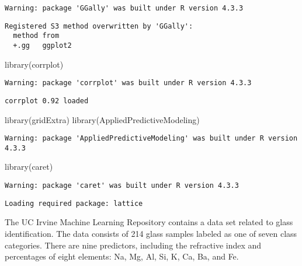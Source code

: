 \documentclass[
  letterpaper,
  DIV=11,
  numbers=noendperiod]{scrartcl}
\newenvironment{Shaded}{\begin{snugshade}}{\end{snugshade}}
\newcommand{\FunctionTok}[1]{\textcolor[rgb]{0.28,0.35,0.67}{#1}}
\newcommand{\NormalTok}[1]{\textcolor[rgb]{0.00,0.23,0.31}{#1}}
\begin{document}
\begin{verbatim}
Warning: package 'GGally' was built under R version 4.3.3
\end{verbatim}

\begin{verbatim}
Registered S3 method overwritten by 'GGally':
  method from   
  +.gg   ggplot2
\end{verbatim}

\begin{Shaded}
\begin{Highlighting}[]
\FunctionTok{library}\NormalTok{(corrplot)}
\end{Highlighting}
\end{Shaded}

\begin{verbatim}
Warning: package 'corrplot' was built under R version 4.3.3
\end{verbatim}

\begin{verbatim}
corrplot 0.92 loaded
\end{verbatim}

\begin{Shaded}
\begin{Highlighting}[]
\FunctionTok{library}\NormalTok{(gridExtra)}
\FunctionTok{library}\NormalTok{(AppliedPredictiveModeling)}
\end{Highlighting}
\end{Shaded}

\begin{verbatim}
Warning: package 'AppliedPredictiveModeling' was built under R version 4.3.3
\end{verbatim}

\begin{Shaded}
\begin{Highlighting}[]
\FunctionTok{library}\NormalTok{(caret)}
\end{Highlighting}
\end{Shaded}

\begin{verbatim}
Warning: package 'caret' was built under R version 4.3.3
\end{verbatim}

\begin{verbatim}
Loading required package: lattice
\end{verbatim}

The UC Irvine Machine Learning Repository contains a data set related to
glass identification. The data consists of 214 glass samples labeled as
one of seven class categories. There are nine predictors, including the
refractive index and percentages of eight elements: Na, Mg, Al, Si, K,
Ca, Ba, and Fe.
\end{document}
